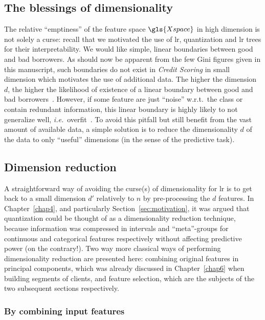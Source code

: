 \subsection{The blessings of dimensionality}

The relative ``emptiness'' of the feature space $\gls{Xspace}$ in high dimension is not solely a curse: recall that we motivated the use of \gls{lr}, quantization and \gls{lr} trees for their interpretability. We would like simple, linear boundaries between good and bad borrowers. As should now be apparent from the few Gini figures given in this manuscript, such boundaries do not exist in \textit{Credit Scoring} in small dimension which motivates the use of additional data. The higher the dimension $d$, the higher the likelihood of existence of a linear boundary between good and bad borrowers~\cite{gorban2018blessing}. However, if some feature are just ``noise'' w.r.t.\ the class or contain redundant information, this linear boundary is highly likely to not generalize well, \textit{i.e.}\ overfit~\cite{bertrandagnan_2017}. To avoid this pitfall but still benefit from the vast amount of available data, a simple solution is to reduce the dimensionality $d$ of the data to only ``useful'' dimensions (in the sense of the predictive task).

\subsection{Dimension reduction}

A straightforward way of avoiding the curse(s) of dimensionality for \gls{lr} is to get back to a small dimension $d'$ relatively to $n$ by pre-processing the $d$ features. In Chapter~\ref{chap4}, and particularly Section~\ref{sec:motivation}, it was argued that quantization could be thought of as a dimensionality reduction technique, because information was compressed in intervals and ``meta''-groups for continuous and categorical features respectively without affecting predictive power (on the contrary!). Two way more classical ways of performing dimensionality reduction are presented here: combining original features in principal components, which was already discussed in Chapter~\ref{chap6} when building segments of clients, and feature selection, which are the subjects of the two subsequent sections respectively.

\subsubsection{By combining input features}

